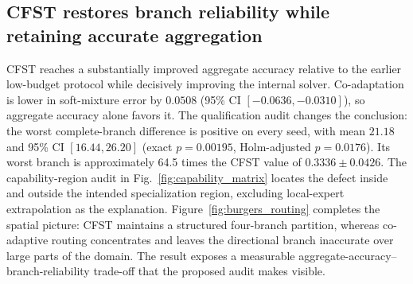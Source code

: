 \documentclass[preprint,12pt]{elsarticle}
\theoremstyle{remark}
\begin{document}
\subsection{CFST restores branch reliability while retaining accurate aggregation}
\begin{table}[H]
\centering\small
\caption{Primary pre-calibration results on the conservative WENO5 reference (ten paired seeds). Differences are co-adaptive minus CFST; $p$ is the exact two-sided sign-flip value.}
\label{tab:main}
\end{table}
CFST reaches a substantially improved aggregate accuracy relative to the earlier low-budget protocol while decisively improving the internal solver. Co-adaptation is lower in soft-mixture error by $0.0508$ (95\% CI $[-0.0636,-0.0310]$), so aggregate accuracy alone favors it. The qualification audit changes the conclusion: the worst complete-branch difference is positive on every seed, with mean $21.18$ and 95\% CI $[16.44,26.20]$ (exact $p=0.00195$, Holm-adjusted $p=0.0176$). Its worst branch is approximately 64.5 times the CFST value of $0.3336\pm0.0426$. The capability-region audit in Fig.~\ref{fig:capability_matrix} locates the defect inside and outside the intended specialization region, excluding local-expert extrapolation as the explanation. Figure~\ref{fig:burgers_routing} completes the spatial picture: CFST maintains a structured four-branch partition, whereas co-adaptive routing concentrates and leaves the directional branch inaccurate over large parts of the domain. The result exposes a measurable aggregate-accuracy--branch-reliability trade-off that the proposed audit makes visible.
\end{document}
